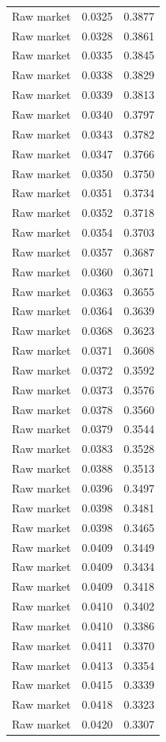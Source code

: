 \begin{table}[htbp]
\begin{tabular}{lll}
Raw market & 0.0325 & 0.3877 \\
Raw market & 0.0328 & 0.3861 \\
Raw market & 0.0335 & 0.3845 \\
Raw market & 0.0338 & 0.3829 \\
Raw market & 0.0339 & 0.3813 \\
Raw market & 0.0340 & 0.3797 \\
Raw market & 0.0343 & 0.3782 \\
Raw market & 0.0347 & 0.3766 \\
Raw market & 0.0350 & 0.3750 \\
Raw market & 0.0351 & 0.3734 \\
Raw market & 0.0352 & 0.3718 \\
Raw market & 0.0354 & 0.3703 \\
Raw market & 0.0357 & 0.3687 \\
Raw market & 0.0360 & 0.3671 \\
Raw market & 0.0363 & 0.3655 \\
Raw market & 0.0364 & 0.3639 \\
Raw market & 0.0368 & 0.3623 \\
Raw market & 0.0371 & 0.3608 \\
Raw market & 0.0372 & 0.3592 \\
Raw market & 0.0373 & 0.3576 \\
Raw market & 0.0378 & 0.3560 \\
Raw market & 0.0379 & 0.3544 \\
Raw market & 0.0383 & 0.3528 \\
Raw market & 0.0388 & 0.3513 \\
Raw market & 0.0396 & 0.3497 \\
Raw market & 0.0398 & 0.3481 \\
Raw market & 0.0398 & 0.3465 \\
Raw market & 0.0409 & 0.3449 \\
Raw market & 0.0409 & 0.3434 \\
Raw market & 0.0409 & 0.3418 \\
Raw market & 0.0410 & 0.3402 \\
Raw market & 0.0410 & 0.3386 \\
Raw market & 0.0411 & 0.3370 \\
Raw market & 0.0413 & 0.3354 \\
Raw market & 0.0415 & 0.3339 \\
Raw market & 0.0418 & 0.3323 \\
Raw market & 0.0420 & 0.3307 \\

\end{tabular}
\end{table}
